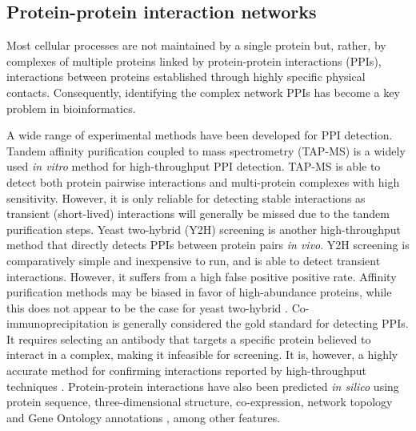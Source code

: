 \subsection{Protein-protein interaction networks}
Most cellular processes are not maintained by a single protein but, rather, by complexes of multiple proteins linked by protein-protein interactions (PPIs), interactions between proteins established through highly specific physical contacts. Consequently, identifying the complex network PPIs has become a key problem in bioinformatics.

A wide range of experimental methods have been developed for PPI detection.
Tandem affinity purification coupled to mass spectrometry (TAP-MS) is a widely used \emph{in vitro} method for high-throughput PPI detection. TAP-MS is able to detect both protein pairwise interactions and multi-protein complexes with high sensitivity. However, it is only reliable for detecting stable interactions as transient (short-lived) interactions will generally be missed due to the tandem purification steps. Yeast two-hybrid (Y2H) screening is another high-throughput method that directly detects PPIs between protein pairs \emph{in vivo}. Y2H screening is comparatively simple and inexpensive to run, and is able to detect transient interactions. However, it suffers from a high false positive positive rate. Affinity purification methods may be biased in favor of high-abundance proteins, while this does not appear to be the case for yeast two-hybrid \cite{Ivanic2009}.
Co-immunoprecipitation is generally considered the gold standard for detecting PPIs. It requires selecting an antibody that targets a specific protein believed to interact in a complex, making it infeasible for screening. It is, however, a highly accurate method for confirming interactions reported by high-throughput techniques \cite{Berggard2007,Rao2014}. Protein-protein interactions have also been predicted \emph{in silico} using protein sequence, three-dimensional structure, co-expression, network topology and Gene Ontology annotations \cite{Elefsinioti2011, Zhang2012, Kotlyar2014}, among other features.

